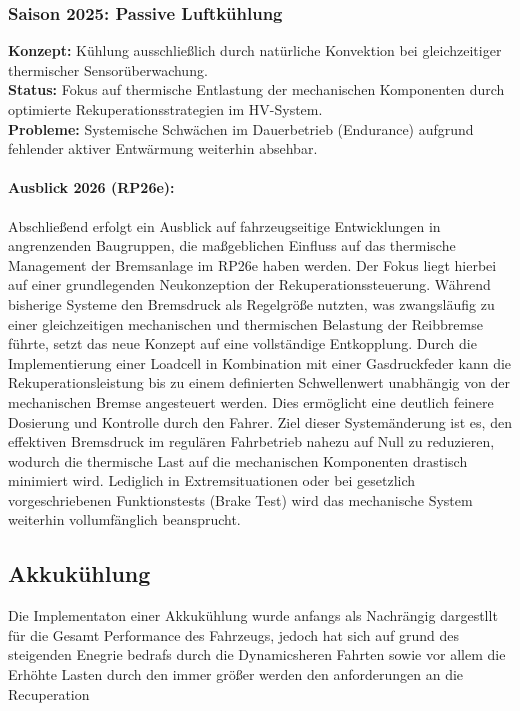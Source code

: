 \subsubsection{Saison 2025: Passive Luftkühlung}
\textbf{Konzept:} Kühlung ausschließlich durch natürliche Konvektion bei gleichzeitiger thermischer Sensorüberwachung. \\
\textbf{Status:} Fokus auf thermische Entlastung der mechanischen Komponenten durch optimierte Rekuperationsstrategien im HV-System. \\
\textbf{Probleme:} Systemische Schwächen im Dauerbetrieb (Endurance) aufgrund fehlender aktiver Entwärmung weiterhin absehbar.

\paragraph{Ausblick 2026 (RP26e):} 
Abschließend erfolgt ein Ausblick auf fahrzeugseitige Entwicklungen in angrenzenden Baugruppen, die maßgeblichen Einfluss auf das thermische Management der Bremsanlage im RP26e haben werden. Der Fokus liegt hierbei auf einer grundlegenden Neukonzeption der Rekuperationssteuerung. Während bisherige Systeme den Bremsdruck als Regelgröße nutzten, was zwangsläufig zu einer gleichzeitigen mechanischen und thermischen Belastung der Reibbremse führte, setzt das neue Konzept auf eine vollständige Entkopplung. Durch die Implementierung einer Loadcell in Kombination mit einer Gasdruckfeder kann die Rekuperationsleistung bis zu einem definierten Schwellenwert unabhängig von der mechanischen Bremse angesteuert werden. Dies ermöglicht eine deutlich feinere Dosierung und Kontrolle durch den Fahrer. Ziel dieser Systemänderung ist es, den effektiven Bremsdruck im regulären Fahrbetrieb nahezu auf Null zu reduzieren, wodurch die thermische Last auf die mechanischen Komponenten drastisch minimiert wird. Lediglich in Extremsituationen oder bei gesetzlich vorgeschriebenen Funktionstests (Brake Test) wird das mechanische System weiterhin vollumfänglich beansprucht.

\subsection{Akkukühlung}
\label{subsec:Accu_cooling_status}

Die Implementaton einer Akkukühlung wurde anfangs als Nachrängig dargestllt für die Gesamt Performance des Fahrzeugs, jedoch hat sich auf grund des steigenden Enegrie bedrafs durch die Dynamicsheren Fahrten sowie vor allem die Erhöhte Lasten durch den immer größer werden den anforderungen an die Recuperation


